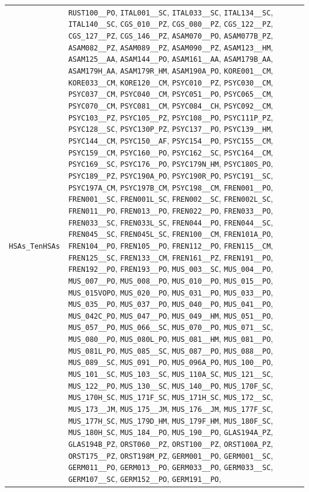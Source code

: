\begin{longtable}{|p{4.4in}|p{4.4in}|}
    \verb|HSAs_TenHSAs| & \verb|RUST100__PO|, \verb|ITAL001__SC|, \verb|ITAL033__SC|, \verb|ITAL134__SC|, \verb|ITAL140__SC|, \verb|CGS_010__PZ|, \verb|CGS_080__PZ|, \verb|CGS_122__PZ|, \verb|CGS_127__PZ|, \verb|CGS_146__PZ|, \verb|ASAM070__PO|, \verb|ASAM077B_PZ|, \verb|ASAM082__PZ|, \verb|ASAM089__PZ|, \verb|ASAM090__PZ|, \verb|ASAM123__HM|, \verb|ASAM125__AA|, \verb|ASAM144__PO|, \verb|ASAM161__AA|, \verb|ASAM179B_AA|, \verb|ASAM179H_AA|, \verb|ASAM179R_HM|, \verb|ASAM190A_PO|, \verb|KORE001__CM|, \verb|KORE033__CM|, \verb|KORE120__CM|, \verb|PSYC010__PZ|, \verb|PSYC030__CM|, \verb|PSYC037__CM|, \verb|PSYC040__CM|, \verb|PSYC051__PO|, \verb|PSYC065__CM|, \verb|PSYC070__CM|, \verb|PSYC081__CM|, \verb|PSYC084__CH|, \verb|PSYC092__CM|, \verb|PSYC103__PZ|, \verb|PSYC105__PZ|, \verb|PSYC108__PO|, \verb|PSYC111P_PZ|, \verb|PSYC128__SC|, \verb|PSYC130P_PZ|, \verb|PSYC137__PO|, \verb|PSYC139__HM|, \verb|PSYC144__CM|, \verb|PSYC150__AF|, \verb|PSYC154__PO|, \verb|PSYC155__CM|, \verb|PSYC159__CM|, \verb|PSYC160__PO|, \verb|PSYC162__SC|, \verb|PSYC164__CM|, \verb|PSYC169__SC|, \verb|PSYC176__PO|, \verb|PSYC179N_HM|, \verb|PSYC180S_PO|, \verb|PSYC189__PZ|, \verb|PSYC190A_PO|, \verb|PSYC190R_PO|, \verb|PSYC191__SC|, \verb|PSYC197A_CM|, \verb|PSYC197B_CM|, \verb|PSYC198__CM|, \verb|FREN001__PO|, \verb|FREN001__SC|, \verb|FREN001L_SC|, \verb|FREN002__SC|, \verb|FREN002L_SC|, \verb|FREN011__PO|, \verb|FREN013__PO|, \verb|FREN022__PO|, \verb|FREN033__PO|, \verb|FREN033__SC|, \verb|FREN033L_SC|, \verb|FREN044__PO|, \verb|FREN044__SC|, \verb|FREN045__SC|, \verb|FREN045L_SC|, \verb|FREN100__CM|, \verb|FREN101A_PO|, \verb|FREN104__PO|, \verb|FREN105__PO|, \verb|FREN112__PO|, \verb|FREN115__CM|, \verb|FREN125__SC|, \verb|FREN133__CM|, \verb|FREN161__PZ|, \verb|FREN191__PO|, \verb|FREN192__PO|, \verb|FREN193__PO|, \verb|MUS_003__SC|, \verb|MUS_004__PO|, \verb|MUS_007__PO|, \verb|MUS_008__PO|, \verb|MUS_010__PO|, \verb|MUS_015__PO|, \verb|MUS_015VOPO|, \verb|MUS_020__PO|, \verb|MUS_031__PO|, \verb|MUS_033__PO|, \verb|MUS_035__PO|, \verb|MUS_037__PO|, \verb|MUS_040__PO|, \verb|MUS_041__PO|, \verb|MUS_042C_PO|, \verb|MUS_047__PO|, \verb|MUS_049__HM|, \verb|MUS_051__PO|, \verb|MUS_057__PO|, \verb|MUS_066__SC|, \verb|MUS_070__PO|, \verb|MUS_071__SC|, \verb|MUS_080__PO|, \verb|MUS_080L_PO|, \verb|MUS_081__HM|, \verb|MUS_081__PO|, \verb|MUS_081L_PO|, \verb|MUS_085__SC|, \verb|MUS_087__PO|, \verb|MUS_088__PO|, \verb|MUS_089__SC|, \verb|MUS_091__PO|, \verb|MUS_096A_PO|, \verb|MUS_100__PO|, \verb|MUS_101__SC|, \verb|MUS_103__SC|, \verb|MUS_110A_SC|, \verb|MUS_121__SC|, \verb|MUS_122__PO|, \verb|MUS_130__SC|, \verb|MUS_140__PO|, \verb|MUS_170F_SC|, \verb|MUS_170H_SC|, \verb|MUS_171F_SC|, \verb|MUS_171H_SC|, \verb|MUS_172__SC|, \verb|MUS_173__JM|, \verb|MUS_175__JM|, \verb|MUS_176__JM|, \verb|MUS_177F_SC|, \verb|MUS_177H_SC|, \verb|MUS_179D_HM|, \verb|MUS_179F_HM|, \verb|MUS_180F_SC|, \verb|MUS_180H_SC|, \verb|MUS_184__PO|, \verb|MUS_190__PO|, \verb|GLAS194A_PZ|, \verb|GLAS194B_PZ|, \verb|ORST060__PZ|, \verb|ORST100__PZ|, \verb|ORST100A_PZ|, \verb|ORST175__PZ|, \verb|ORST198M_PZ|, \verb|GERM001__PO|, \verb|GERM001__SC|, \verb|GERM011__PO|, \verb|GERM013__PO|, \verb|GERM033__PO|, \verb|GERM033__SC|, \verb|GERM107__SC|, \verb|GERM152__PO|, \verb|GERM191__PO|, 
\end{longtable}
